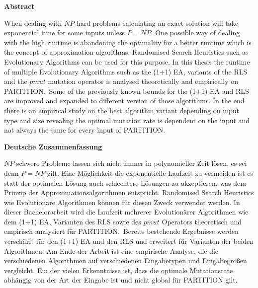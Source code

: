 \documentclass{thesisclass}
\begin{document}
\begin{addmargin}{0.5cm}

      \centerline{\textbf{Abstract}}

      When dealing with $NP$-hard problems calculating an exact solution will take exponential time for some inputs unless $P=NP$.
      One possible way of dealing with the high runtime is abandoning the optimality for a better runtime which is the concept of approximation-algorithms.
      Randomised Search Heuristics such as Evolutionary Algorithms can be used for this purpose.
      In this thesis the runtime of multiple Evolutionary Algorithms such as the (1+1) EA, variants of the RLS and the $pmut$ mutation operator is analysed theoretically and empirically on PARTITION.\ 
      Some of the previously known bounds for the (1+1) EA and RLS are improved and expanded to different version of those algorithms.
      In the end there is an empirical study on the best algorithm variant depending on input type and size revealing the optimal mutation rate is dependent on the input and not always the same for every input of PARTITION.\

      \centerline{\textbf{Deutsche Zusammenfassung}}

      $NP$-schwere Probleme lassen sich nicht immer in polynomieller Zeit lösen, es sei denn $P=NP$ gilt.
      Eine Möglichkeit die exponentielle Laufzeit zu vermeiden ist es statt der optimalen Lösung auch schlechtere Lösungen zu akzeptieren, was dem Prinzip der Approximationsalgorithmen entspricht.
      Randomised Search Heuristics wie Evolutionäre Algorithmen können für diesen Zweck verwendet werden.
      In dieser Bachelorarbeit wird die Laufzeit mehrerer Evolutionärer Algorithmen wie dem (1+1) EA, Varianten des RLS sowie des $pmut$ Operators theoretisch und empirisch analysiert für PARTITION.\ 
      Bereits bestehende Ergebnisse werden verschärft für den (1+1) EA und den RLS und erweitert für Varianten der beiden Algorithmen.
      Am Ende der Arbeit ist eine empirische Analyse, die die verschiedenen Algorithmen auf verschiedenen Eingabetypen und Eingabegrößen vergleicht.
      Ein der vielen Erkenntnisse ist, dass die optimale Mutationsrate abhängig von der Art der Eingabe ist und nicht global für PARTITION gilt.


\end{addmargin}

\blankpage

\end{document}
